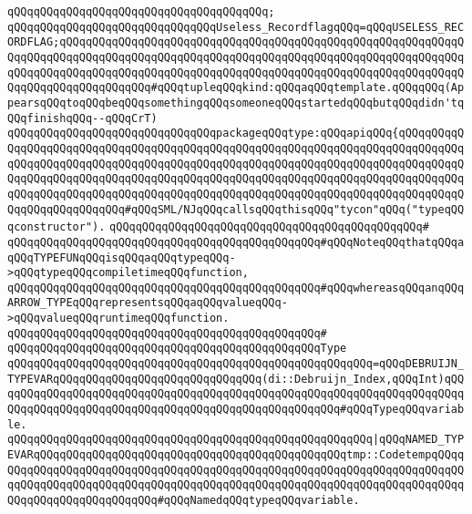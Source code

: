 \verb|qQQqqQQqqQQqqQQqqQQqqQQqqQQqqQQqqQQqqQQq;|\newline
\newline
\verb|qQQqqQQqqQQqqQQqqQQqqQQqqQQqqQQqUseless_RecordflagqQQq=qQQqUSELESS_RECORDFLAG;qQQqqQQqqQQqqQQqqQQqqQQqqQQqqQQqqQQqqQQqqQQqqQQqqQQqqQQqqQQqqQQqqQQqqQQqqQQqqQQqqQQqqQQqqQQqqQQqqQQqqQQqqQQqqQQqqQQqqQQqqQQqqQQqqQQqqQQqqQQqqQQqqQQqqQQqqQQqqQQqqQQqqQQqqQQqqQQqqQQqqQQqqQQqqQQqqQQqqQQqqQQqqQQqqQQqqQQqqQQqqQQq#qQQqtupleqQQqkind:qQQqaqQQqtemplate.qQQqqQQq(AppearsqQQqtoqQQqbeqQQqsomethingqQQqsomeoneqQQqstartedqQQqbutqQQqdidn'tqQQqfinishqQQq--qQQqCrT)|\newline
\newline
\verb|qQQqqQQqqQQqqQQqqQQqqQQqqQQqqQQqpackageqQQqtype:qQQqapiqQQq{qQQqqQQqqQQqqQQqqQQqqQQqqQQqqQQqqQQqqQQqqQQqqQQqqQQqqQQqqQQqqQQqqQQqqQQqqQQqqQQqqQQqqQQqqQQqqQQqqQQqqQQqqQQqqQQqqQQqqQQqqQQqqQQqqQQqqQQqqQQqqQQqqQQqqQQqqQQqqQQqqQQqqQQqqQQqqQQqqQQqqQQqqQQqqQQqqQQqqQQqqQQqqQQqqQQqqQQqqQQqqQQqqQQqqQQqqQQqqQQqqQQqqQQqqQQqqQQqqQQqqQQqqQQqqQQqqQQqqQQqqQQqqQQqqQQqqQQqqQQqqQQqqQQq#qQQqSML/NJqQQqcallsqQQqthisqQQq"tycon"qQQq("typeqQQqconstructor").|\newline
\verb|qQQqqQQqqQQqqQQqqQQqqQQqqQQqqQQqqQQqqQQqqQQqqQQq#|\newline
\verb|qQQqqQQqqQQqqQQqqQQqqQQqqQQqqQQqqQQqqQQqqQQqqQQq#qQQqNoteqQQqthatqQQqaqQQqTYPEFUNqQQqisqQQqaqQQqtypeqQQq->qQQqtypeqQQqcompiletimeqQQqfunction,|\newline
\verb|qQQqqQQqqQQqqQQqqQQqqQQqqQQqqQQqqQQqqQQqqQQqqQQq#qQQqwhereasqQQqanqQQqARROW_TYPEqQQqrepresentsqQQqaqQQqvalueqQQq->qQQqvalueqQQqruntimeqQQqfunction.|\newline
\verb|qQQqqQQqqQQqqQQqqQQqqQQqqQQqqQQqqQQqqQQqqQQqqQQq#|\newline
\verb|qQQqqQQqqQQqqQQqqQQqqQQqqQQqqQQqqQQqqQQqqQQqqQQqType|\newline
\verb|qQQqqQQqqQQqqQQqqQQqqQQqqQQqqQQqqQQqqQQqqQQqqQQqqQQqqQQq=qQQqDEBRUIJN_TYPEVARqQQqqQQqqQQqqQQqqQQqqQQqqQQqqQQq(di::Debruijn_Index,qQQqInt)qQQqqQQqqQQqqQQqqQQqqQQqqQQqqQQqqQQqqQQqqQQqqQQqqQQqqQQqqQQqqQQqqQQqqQQqqQQqqQQqqQQqqQQqqQQqqQQqqQQqqQQqqQQqqQQqqQQqqQQqqQQq#qQQqTypeqQQqvariable.|\newline
\verb|qQQqqQQqqQQqqQQqqQQqqQQqqQQqqQQqqQQqqQQqqQQqqQQqqQQqqQQq|\verb#|qQQqNAMED_TYPEVARqQQqqQQqqQQqqQQqqQQqqQQqqQQqqQQqqQQqqQQqqQQqqQQqtmp::CodetempqQQqqQQqqQQqqQQqqQQqqQQqqQQqqQQqqQQqqQQqqQQqqQQqqQQqqQQqqQQqqQQqqQQqqQQqqQQqqQQqqQQqqQQqqQQqqQQqqQQqqQQqqQQqqQQqqQQqqQQqqQQqqQQqqQQqqQQqqQQqqQQqqQQqqQQqqQQqqQQqqQQqqQQq#\verb|#qQQqNamedqQQqtypeqQQqvariable.|\newline

